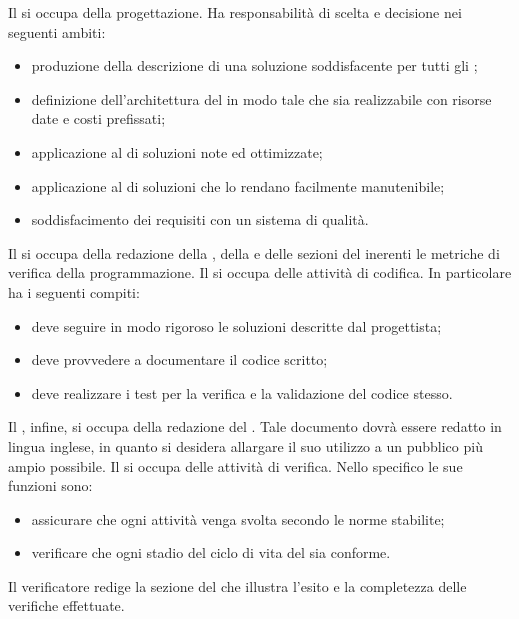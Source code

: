 				Il  si occupa della progettazione. Ha responsabilità di scelta e decisione nei seguenti ambiti:
				\begin{itemize}
					\item produzione della descrizione di una soluzione soddisfacente per tutti gli ;
					\item definizione dell'architettura del  in modo tale che sia realizzabile con risorse date e costi prefissati;
					\item applicazione al  di soluzioni note ed ottimizzate;
					\item applicazione al  di soluzioni che lo rendano facilmente manutenibile;
					\item soddisfacimento dei requisiti con un sistema di qualità.
				\end{itemize}
				Il  si occupa della redazione della , della  e delle sezioni del  inerenti le metriche di verifica della programmazione.
				Il  si occupa delle attività di codifica. In particolare ha i seguenti compiti:
				\begin{itemize}
					\item deve seguire in modo rigoroso le soluzioni descritte dal progettista;
					\item deve provvedere a documentare il codice scritto;
					\item deve realizzare i test per la verifica e la validazione del codice stesso.
				\end{itemize}
				Il , infine, si occupa della redazione del . Tale documento dovrà essere redatto in lingua inglese, in quanto si desidera allargare il suo utilizzo a un pubblico più ampio possibile.
				Il  si occupa delle attività di verifica. Nello specifico le sue funzioni sono:
				\begin{itemize}
					\item assicurare che ogni attività venga svolta secondo le norme stabilite;
					\item verificare che ogni stadio del ciclo di vita del  sia conforme.
				\end{itemize}
				Il verificatore redige la sezione del  che illustra l’esito e la completezza delle verifiche effettuate.
